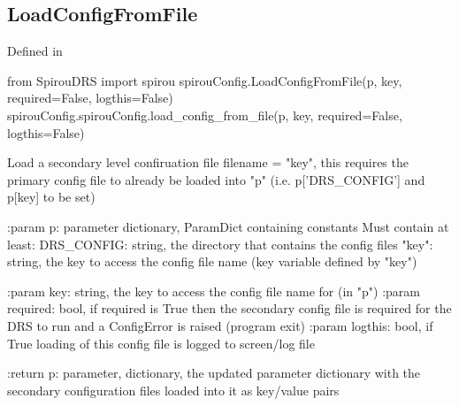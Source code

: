 \begin{minipage}{\textwidth}
\subsection{LoadConfigFromFile}

Defined in \spirouConfig{}

\begin{pythonbox}
from SpirouDRS import spirou
spirouConfig.LoadConfigFromFile(p, key, required=False, logthis=False)
spirouConfig.spirouConfig.load_config_from_file(p, key, required=False, logthis=False)
\end{pythonbox}

\begin{pythondocstring}
Load a secondary level confiruation file filename = "key", this requires
the primary config file to already be loaded into "p"
(i.e. p['DRS_CONFIG'] and p[key] to be set)

:param p: parameter dictionary, ParamDict containing constants
    Must contain at least:
            DRS_CONFIG: string, the directory that contains the config files
            "key": string, the key to access the config file name
                   (key variable defined by "key")

:param key: string, the key to access the config file name for (in "p")
:param required: bool, if required is True then the secondary config file
                 is required for the DRS to run and a ConfigError is raised
                 (program exit)
:param logthis: bool, if True loading of this config file is logged to
                screen/log file

:return p: parameter, dictionary, the updated parameter dictionary with
           the secondary configuration files loaded into it as key/value
           pairs
\end{pythondocstring}
\end{minipage}

